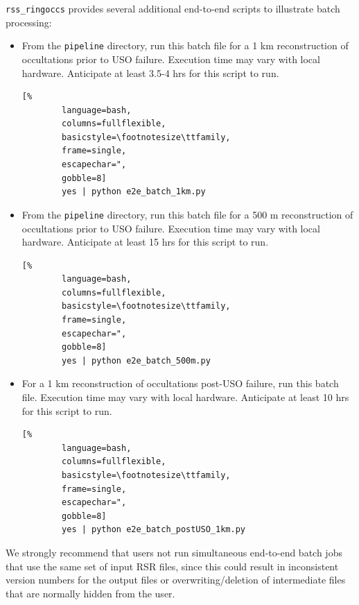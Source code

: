 \documentclass[titlepage, 12pt]{article}
\begin{document}
            \par\hfill\par
            \texttt{rss\_ringoccs} provides several additional end-to-end scripts to illustrate batch processing:
            \begin{itemize}
                \item From the \texttt{pipeline} directory, run this batch file for a 1 km reconstruction of occultations prior to USO failure. Execution time may vary with local hardware. Anticipate at least 3.5-4 hrs for this script to run.
    \begin{lstlisting}[%
        language=bash,
        columns=fullflexible,
        basicstyle=\footnotesize\ttfamily,
        frame=single,
        escapechar=",
        gobble=8]
        yes | python e2e_batch_1km.py
    \end{lstlisting}
    \item From the \texttt{pipeline} directory, run this batch file for a 500 m reconstruction of occultations prior to USO failure. Execution time may vary with local hardware. Anticipate at least 15 hrs for this script to run.
    \begin{lstlisting}[%
        language=bash,
        columns=fullflexible,
        basicstyle=\footnotesize\ttfamily,
        frame=single,
        escapechar=",
        gobble=8]
        yes | python e2e_batch_500m.py
    \end{lstlisting}
    \item For a 1 km reconstruction of occultations post-USO failure, run this batch file. Execution time may vary with local hardware. Anticipate at least 10 hrs for this script to run.
    \begin{lstlisting}[%
        language=bash,
        columns=fullflexible,
        basicstyle=\footnotesize\ttfamily,
        frame=single,
        escapechar=",
        gobble=8]
        yes | python e2e_batch_postUSO_1km.py
    \end{lstlisting}
\end{itemize}
We strongly recommend that users not run simultaneous end-to-end batch jobs that use the same set of input RSR files, since this could result in inconsistent version numbers for the output files or overwriting/deletion of intermediate files that are normally hidden from the user.
\end{document}
